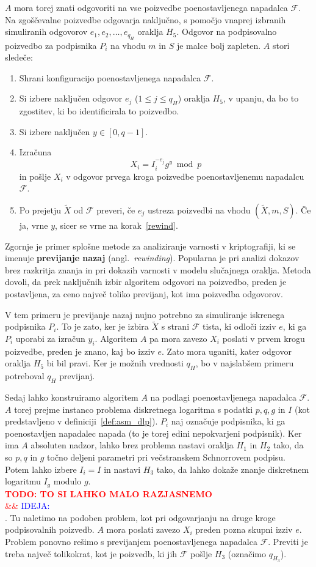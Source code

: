 \documentclass[isrm2, tisk]{fmfdelo}
\newcommand{\todo}[2][]{%
    \textcolor{red}{%
        \\ \textbf{\uppercase{todo: #2}}%
        \\%
        \ifx&#1&%
        \else%
            \textcolor{blue}{\uppercase{ideja:} #1}%
            \\%
        \fi%
    }%
}
\begin{document}
$A$ mora torej znati odgovoriti na vse poizvedbe poenostavljenega napadalca $\mathcal{F}$. Na zgoščevalne 
poizvedbe odgovarja naključno, s pomočjo vnaprej izbranih simuliranih odgovorov $e_1, e_2, \dots, 
e_{q_H}$ oraklja $H_5$. Odgovor na podpisovalno poizvedbo za podpisnika $P_i$ na vhodu $m$ in $S$
je malce bolj zapleten. $A$ stori sledeče:
\begin{enumerate}
    \item Shrani konfiguracijo poenostavljenega napadalca $\mathcal{F}$.
    \item \label{rewind} Si izbere naključen odgovor $e_j$ ($1 \le j \le q_H$) oraklja $H_5$, 
        v upanju, da bo to zgostitev, ki bo identificirala to poizvedbo.
    \item Si izbere naključen $y \in [0, q - 1]$.
    \item Izračuna 
        $$
        X_i = I_i^{-e_j}g^y \bmod p
        $$
        in pošlje $X_i$ v odgovor prvega kroga poizvedbe poenostavljenemu napadalcu $\mathcal{F}$.
    \item Po prejetju $\tilde{X}$ od $\mathcal{F}$ preveri, če $e_j$ ustreza poizvedbi na vhodu
        $(\tilde{X}, m, S)$. Če ja, vrne $y$, sicer se vrne na korak~\ref{rewind}.
\end{enumerate}
Zgornje je primer splošne metode za analiziranje varnosti v kriptografiji, ki se imenuje 
\textbf{previjanje nazaj} (angl.\ \textit{rewinding}). Popularna je pri analizi dokazov brez razkritja
znanja in pri dokazih varnosti v modelu slučajnega oraklja. Metoda dovoli, da prek naključnih izbir
algoritem odgovori na poizvedbo, preden je postavljena, za ceno največ toliko previjanj, kot ima
poizvedba odgovorov.

V tem primeru je previjanje nazaj nujno potrebno za simuliranje iskrenega podpisnika $P_i$. To je zato,
ker je izbira $\tilde{X}$ s strani $\mathcal{F}$ tista, ki odloči izziv $e$, ki ga $P_i$ uporabi za
izračun $y_i$. Algoritem $A$ pa mora zavezo $X_i$ poslati v prvem krogu poizvedbe, preden je znano,
kaj bo izziv $e$. Zato mora uganiti, kater odgovor oraklja $H_5$ bi bil pravi. Ker je možnih vrednosti
$q_H$, bo v najslabšem primeru potreboval $q_H$ previjanj.

Sedaj lahko konstruiramo algoritem $A$ na podlagi poenostavljenega napadalca $\mathcal{F}$. $A$ torej
prejme instanco problema diskretnega logaritma s podatki $p, q, g$ in $I$ (kot predstavljeno v 
definiciji~\ref{def:asm_dlp}). $P_i$ naj označuje podpisnika, ki ga poenostavljen napadalec napada
(to je torej edini nepokvarjeni podpisnik). Ker ima $A$ absoluten nadzor, lahko brez problema
nastavi oraklja $H_1$ in $H_2$ tako, da so $p, q$ in $g$ točno deljeni parametri pri večstranskem
Schnorrovem podpisu. Potem lahko izbere $I_i = I$ in nastavi $H_3$ tako, da lahko dokaže znanje
diskretnem logaritmu $I_g$ modulo $g$. \todo{to si lahko malo razjasnemo}. Tu naletimo na podoben
problem, kot pri odgovarjanju na druge kroge podpisovalnih poizvedb. $A$ mora poslati zavezo $X_i$
preden pozna skupni izziv $e$. Problem ponovno rešimo s previjanjem poenostavljenega napadalca
$\mathcal{F}$. Previti je treba največ tolikokrat, kot je poizvedb, ki jih $\mathcal{F}$ pošlje
$H_3$ (označimo $q_{H_3}$).
\end{document}
